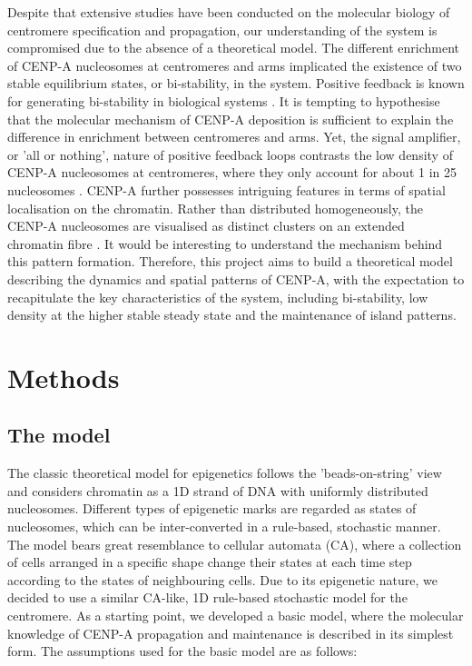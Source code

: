 Despite that extensive studies have been conducted on the molecular biology of centromere specification and propagation, our understanding of the system is compromised due to the absence of a theoretical model. The different enrichment of CENP-A nucleosomes at centromeres and arms implicated the existence of two stable equilibrium states, or bi-stability, in the system. Positive feedback is known for generating bi-stability in biological systems \citep{Mitrophanov2008PositiveSystems, Ferrell2013FeedbackCycle}. It is tempting to hypothesise that the molecular mechanism of CENP-A deposition is sufficient to explain the difference in enrichment between centromeres and arms. Yet, the signal amplifier, or 'all or nothing', nature of positive feedback loops contrasts the low density of CENP-A nucleosomes at centromeres, where they only account for about 1 in 25 nucleosomes \citep{Bodor2014, Schittenhelm2010}. CENP-A further possesses intriguing features in terms of spatial localisation on the chromatin. Rather than distributed homogeneously, the CENP-A nucleosomes are visualised as distinct clusters on an extended chromatin fibre \citep{Blower2002ConservedHumans, Dunleavy2011H3.3Phase., Kyriacou2018}. It would be interesting to understand the mechanism behind this pattern formation. Therefore, this project aims to build a theoretical model describing the dynamics and spatial patterns of CENP-A, with the expectation to recapitulate the key characteristics of the system, including bi-stability, low density at the higher stable steady state and the maintenance of island patterns. 

 
\section{Methods}
\subsection{The model}

The classic theoretical model for epigenetics \citep{Dodd2007, Micheelsen2010TheoryLandscapes} follows the 'beads-on-string' view and considers chromatin as a 1D strand of DNA with uniformly distributed nucleosomes. Different types of epigenetic marks are regarded as states of nucleosomes, which can be inter-converted in a rule-based, stochastic manner. The model bears great resemblance to cellular automata (CA), where a collection of cells arranged in a specific shape change their states at each time step according to the states of neighbouring cells. Due to its epigenetic nature, we decided to use a similar CA-like, 1D rule-based stochastic model for the centromere. As a starting point, we developed a basic model, where the molecular knowledge of CENP-A propagation and maintenance is described in its simplest form. The assumptions used for the basic model are as follows: 

